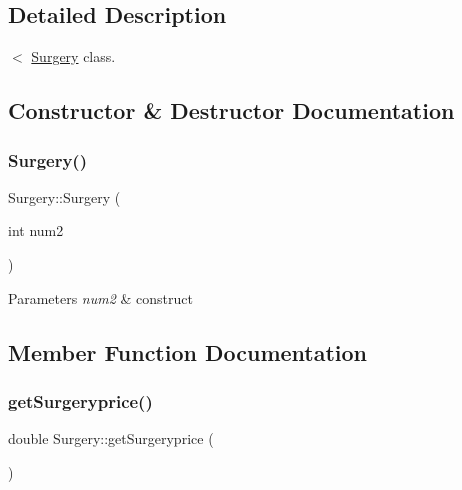 \subsection{Detailed Description}
$<$ \mbox{\hyperlink{class_surgery}{Surgery}} class. 

\subsection{Constructor \& Destructor Documentation}
\mbox{\label{class_surgery_ae376283f188fd75ec5a2947bdcc56986}} 
\subsubsection{\texorpdfstring{Surgery()}{Surgery()}}
{\footnotesize\ttfamily Surgery\+::\+Surgery (\begin{DoxyParamCaption}\item[{int}]{num2 }\end{DoxyParamCaption})\hspace{0.3cm}{\ttfamily [inline]}}


\begin{DoxyParams}{Parameters}
{\em num2} & construct \\
\hline
\end{DoxyParams}


\subsection{Member Function Documentation}
\mbox{\label{class_surgery_a6db6501d78eff0c3e1ad401d05368dfc}} 
\subsubsection{\texorpdfstring{getSurgeryprice()}{getSurgeryprice()}}
{\footnotesize\ttfamily double Surgery\+::get\+Surgeryprice (\begin{DoxyParamCaption}{ }\end{DoxyParamCaption})\hspace{0.3cm}{\ttfamily [inline]}}

\mbox{\label{class_surgery_a2af2f89816594ffd286ad7442b7dd50f}} 
